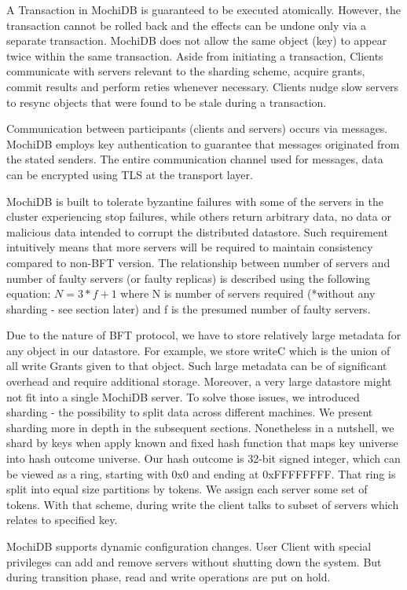 \documentclass[letterpaper,twocolumn,10pt]{article}
\begin{document}
A Transaction in MochiDB is guaranteed to be executed atomically. However, the transaction cannot be rolled back and the effects can be undone only via a separate transaction. MochiDB does not allow the same object (key) to appear twice within the same transaction. Aside from initiating a transaction, Clients communicate with servers relevant to the sharding scheme, acquire grants, commit results and perform reties whenever necessary. Clients nudge slow servers to resync objects that were found to be stale during a transaction.

Communication between participants (clients and servers) occurs via messages. MochiDB employs key authentication to guarantee that messages originated from the stated senders. The entire communication channel used for messages, data can be encrypted using TLS at the transport layer.

MochiDB is built to tolerate byzantine failures with some of the servers in the cluster experiencing stop failures, while others return arbitrary data, no data or malicious data intended to corrupt the distributed datastore. Such requirement intuitively means that more servers will be required to maintain consistency compared to non-BFT version. The relationship between number of servers and number of faulty servers (or faulty replicas) is described using the following equation:
$N = 3*f + 1$  where N is number of servers required (*without any sharding - see section later) and f is the presumed number of faulty servers.

Due to the nature of BFT protocol, we have to store relatively large metadata for any object in our datastore. For example, we store writeC which is the union of all write Grants given to that object. Such large metadata can be of significant overhead and require additional storage. Moreover, a very large datastore might not fit into a single MochiDB server. To solve those issues, we introduced sharding - the possibility to split data across different machines. We present sharding more in depth in the subsequent sections. Nonetheless in a nutshell, we shard by keys when apply known and fixed hash function that maps key universe into hash outcome universe. Our hash outcome is 32-bit signed integer, which can be viewed as a ring, starting with 0x0 and ending at 0xFFFFFFFF. That ring is split into equal size partitions by tokens. We assign each server some set of tokens. With that scheme, during write the client talks to subset of servers which relates to specified key. 

MochiDB supports dynamic configuration changes. User Client with special privileges can add and remove servers without shutting down the system. But during transition phase, read and write operations are put on hold.
\end{document}
